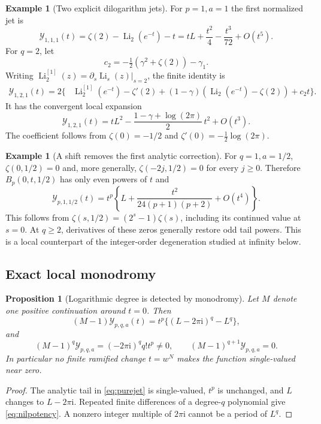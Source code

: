 \documentclass[11pt,a4paper]{article}
\numberwithin{equation}{section}
\newtheorem{proposition}[theorem]{Proposition}
\theoremstyle{definition}
\newtheorem{example}[theorem]{Example}
\theoremstyle{remark}
\DeclareMathOperator{\Li}{Li}
\newcommand{\ii}{\mathrm i}
\newcommand{\cY}{\mathcal Y}
\begin{document}
\begin{example}[Two explicit dilogarithm jets]\label{ex:dilogjets}
For $p=1,a=1$ the first normalized jet is
\begin{equation}\label{eq:Y11}
 \cY_{1,1,1}(t)=\zeta(2)-\Li_2(e^{-t})-t
 =tL+\frac{t^2}{4}-\frac{t^3}{72}+O(t^5).
\end{equation}
For $q=2$, let
\[
 c_2=-\tfrac12(\gamma^2+\zeta(2))-\gamma_1.
\]
Writing $\Li^{[1]}_2(z)=\partial_s\Li_s(z)|_{s=2}$, the finite identity is
\begin{align}\label{eq:Y12}
 \cY_{1,2,1}(t)=2\bigl\{
 &\Li^{[1]}_2(e^{-t})-\zeta'(2)
 +(1-\gamma)(\Li_2(e^{-t})-\zeta(2))+c_2t\bigr\}.
\end{align}
It has the convergent local expansion
\begin{equation}\label{eq:Y12tail}
 \cY_{1,2,1}(t)=tL^2-
 \frac{1-\gamma+\log(2\pi)}2\,t^2+O(t^3).
\end{equation}
The coefficient follows from $\zeta(0)=-1/2$ and
$\zeta'(0)=-\tfrac12\log(2\pi)$.
\end{example}

\begin{example}[A shift removes the first analytic correction]
For $q=1,a=1/2$, $\zeta(0,1/2)=0$ and, more generally,
$\zeta(-2j,1/2)=0$ for every $j\ge0$. Therefore
$B_p(0,t,1/2)$ has only even powers of $t$ and
\begin{equation}\label{eq:halfshift}
 \cY_{p,1,1/2}(t)=t^p\left\{L+
 \frac{t^2}{24(p+1)(p+2)}+O(t^4)\right\}.
\end{equation}
This follows from
$\zeta(s,1/2)=(2^s-1)\zeta(s)$, including its continued value at
$s=0$. At $q\ge2$, derivatives of these zeros generally restore odd
tail powers. This is a local counterpart of the integer-order
degeneration studied at infinity below.
\end{example}

\subsection{Exact local monodromy}

\begin{proposition}[Logarithmic degree is detected by monodromy]
\label{prop:monodromy}
Let $M$ denote one positive continuation around $t=0$. Then
\begin{equation}\label{eq:monodromy}
 (M-1)\cY_{p,q,a}(t)=t^p\{(L-2\pi\ii)^q-L^q\},
\end{equation}
and
\begin{equation}\label{eq:nilpotency}
 (M-1)^q\cY_{p,q,a}=(-2\pi\ii)^q q!t^p\ne0,
 \qquad (M-1)^{q+1}\cY_{p,q,a}=0.
\end{equation}
In particular no finite ramified change $t=w^N$ makes the function
single-valued near zero.
\end{proposition}
\begin{proof}
The analytic tail in \eqref{eq:purejet} is single-valued, $t^p$ is
unchanged, and $L$ changes to $L-2\pi\ii$. Repeated finite differences
of a degree-$q$ polynomial give \eqref{eq:nilpotency}. A nonzero
integer multiple of $2\pi\ii$ cannot be a period of $L^q$.
\end{proof}
\end{document}
